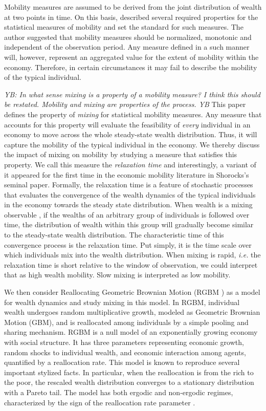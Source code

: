 \documentclass[11pt]{article}
\newcommand{\blue}[1]{{\color{blue} #1}}
\newcommand{\ie}{{\it i.e.}\xspace}
\newcommand{\YB}[1]{\blue{{\it YB: #1 YB}}}
\numberwithin{equation}{section}
\begin{document}
Mobility measures are assumed to be derived from the joint distribution of wealth at two points in time. On this basis, \citet{Shorrocks1978} described several required properties for the statistical measures of mobility and set the standard for such measures. The author suggested that mobility measures should be normalized, monotonic and independent of the observation period. Any measure defined in a such manner will, however, represent an aggregated value for the extent of mobility within the economy. Therefore, in certain circumstances it may fail to describe the mobility of the typical individual.

\YB{In what sense mixing is a property of a mobility measure? I think this should be restated. Mobility and mixing are properties of the process.}
This paper defines the property of \textit{mixing} for statistical mobility measures. Any measure that accounts for this property will evaluate the feasibility of \textit{every} individual in an economy to move across the whole steady-state wealth distribution. Thus, it will capture the mobility of the typical individual in the economy. We thereby discuss the impact of mixing on mobility by studying a measure that satisfies this property. We call this measure the \textit{relaxation time} and interestingly, a variant of it appeared for the first time in the economic mobility literature in Shorocks's seminal paper. Formally, the relaxation time is a feature of stochastic processes that evaluates the convergence of the wealth dynamics of the typical individuals in the economy towards the steady state distribution. When wealth is a mixing observable \citep{PetersAdamou2018c}, if the wealths of an arbitrary group of individuals is followed over time, the distribution of wealth within this group will gradually become similar to the steady-state wealth distribution. The characteristic time of this convergence process is the relaxation time. Put simply, it is the time scale over which individuals mix into the wealth distribution. When mixing is rapid, \ie the relaxation time is short relative to the window of observation, we could interpret that as high wealth mobility. Slow mixing is interpreted as low mobility.

We then consider Reallocating Geometric Brownian Motion (RGBM \citep{MarsiliMaslovZhang1998,LiuSerota2017,BermanPetersAdamou2019}) as a model for wealth dynamics and study mixing in this model. In RGBM, individual wealth undergoes random multiplicative growth, modeled as Geometric Brownian Motion (GBM), and is reallocated among individuals by a simple pooling and sharing mechanism. RGBM is a null model of an exponentially growing economy with social structure. It has three parameters representing economic growth, random shocks to individual wealth, and economic interaction among agents, quantified by a reallocation rate. This model is known to reproduce several important stylized facts. In particular, when the reallocation is from the rich to the poor, the rescaled wealth distribution converges to a stationary distribution with a Pareto tail. The model has both ergodic and non-ergodic regimes, characterized by the sign of the reallocation rate parameter \citep{BermanPetersAdamou2019}.
\end{document}
